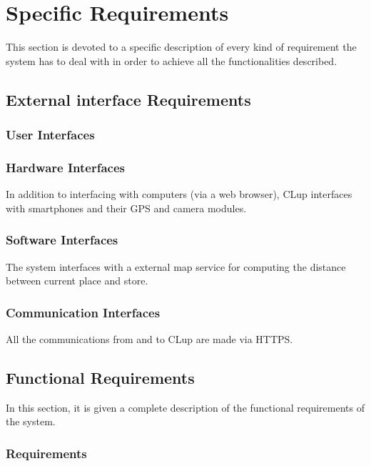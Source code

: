 \chapter{Specific Requirements}
This section is devoted to a specific description of every kind of requirement the
system has to deal with in order to achieve all the functionalities described.

\section{External interface Requirements}
\subsection{User Interfaces}

\clearpage

\subsection{Hardware Interfaces}
In addition to interfacing with computers (via a web browser), CLup interfaces with smartphones and their GPS and camera modules.

\subsection{Software Interfaces}
The system interfaces with a external map service for computing the distance between current place and store.

\subsection{Communication Interfaces}
All the communications from and to CLup are made via HTTPS.

\section{Functional Requirements}
In this section, it is given a complete description of the functional requirements of the system.

    \subsection{Requirements}
